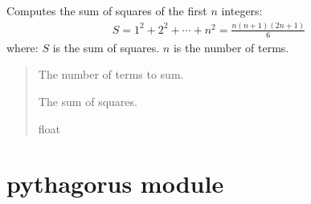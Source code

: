 \documentclass[a4paper,14pt,oneside,english,openany]{sphinxmanual}
\begin{document}
\begin{fulllineitems}
\label{\detokenize{newtest:newtest.sum_of_squares}}
\pysigstartsignatures
{}
\pysigstopsignatures
\sphinxAtStartPar
Computes the sum of squares of the first \(n\) integers:
\begin{equation*}
\begin{split}S = 1^2 + 2^2 + \cdots + n^2 = \frac{n(n+1)(2n+1)}{6}\end{split}
\end{equation*}
\sphinxAtStartPar
where:
\sphinxhyphen{} \(S\) is the sum of squares.
\sphinxhyphen{} \(n\) is the number of terms.
\begin{quote}\begin{description}
\sphinxAtStartPar
{} \textendash{} The number of terms to sum.

\sphinxAtStartPar
The sum of squares.

\sphinxAtStartPar
float

\end{description}\end{quote}

\end{fulllineitems}


\sphinxstepscope


\section{pythagorus module}
\label{\detokenize{pythagorus:module-pythagorus}}\label{\detokenize{pythagorus:pythagorus-module}}\label{\detokenize{pythagorus::doc}}
\end{document}

